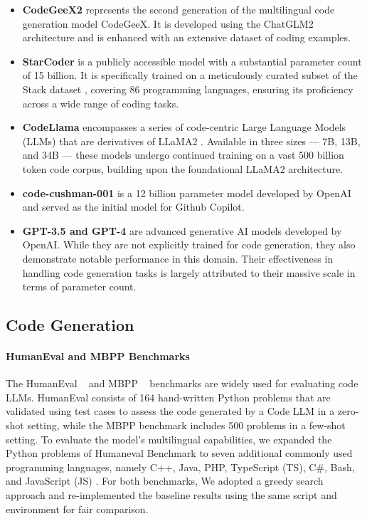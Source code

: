 \begin{itemize}
    \item \textbf{CodeGeeX2} \citep{zheng2023codegeex} represents the second generation of the multilingual code generation model CodeGeeX. It is developed using the ChatGLM2 \citep{du2022glm} architecture and is enhanced with an extensive dataset of coding examples.
    \item \textbf{StarCoder} \citep{li2023starcoder} is a publicly accessible model with a substantial parameter count of 15 billion. It is specifically trained on a meticulously curated subset of the Stack dataset \citep{kocetkov2022stack}, covering 86 programming languages, ensuring its proficiency across a wide range of coding tasks.
    \item \textbf{CodeLlama} \citep{roziere2023code} encompasses a series of code-centric Large Language Models (LLMs) that are derivatives of LLaMA2 \citep{touvron2023llama}. Available in three sizes — 7B, 13B, and 34B — these models undergo continued training on a vast 500 billion token code corpus, building upon the foundational LLaMA2 architecture.
    \item \textbf{code-cushman-001}  \cite{chen2021evaluating} is a 12 billion parameter model developed by OpenAI and served as the initial model for Github Copilot.

    \item \textbf{GPT-3.5 and GPT-4} \citep{openai2023gpt4} are advanced generative AI models developed by OpenAI. While they are not explicitly trained for code generation, they also demonstrate notable performance in this domain. Their effectiveness in handling code generation tasks is largely attributed to their massive scale in terms of parameter count.
\end{itemize}

\subsection{Code Generation}
\label{sec:code_generation}

\paragraph{HumanEval and MBPP Benchmarks} The HumanEval ~\citep{chen2021evaluating} and MBPP ~\citep{austin2021program} benchmarks are widely used for evaluating code LLMs. HumanEval consists of 164 hand-written Python problems that are validated using test cases to assess the code generated by a Code LLM in a zero-shot setting, while the MBPP benchmark includes 500 problems in a few-shot setting. To evaluate the model's multilingual capabilities, we expanded the Python problems of Humaneval Benchmark to seven additional commonly used programming languages, namely C++, Java, PHP, TypeScript (TS), C\#, Bash, and JavaScript (JS) \citep{cassano2023multipl}. For both benchmarks, We adopted a greedy search approach and re-implemented the baseline results using the same script and environment for fair comparison. 


